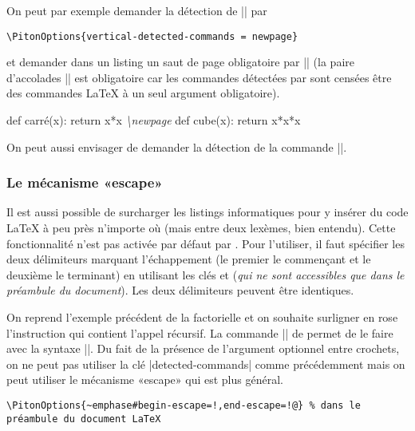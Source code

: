\documentclass[dvipsnames,svgnames]{article}
\begin{document}
\smallskip
On peut par exemple demander la détection de |\newpage| par

\begin{Verbatim}
\PitonOptions{vertical-detected-commands = newpage}
\end{Verbatim}

et demander dans un listing un saut de page obligatoire par |\newpage{}| (la paire
d'accolades |{}| est obligatoire car les commandes détectées par  sont censées
être des commandes LaTeX à un seul argument obligatoire).

\medskip
\begin{Code}
\begin{Piton}
def carré(x):
    return x*x   \emph{\textbackslash{}newpage{}}
def cube(x):
    return x*x*x
\end{Piton}    
\end{Code}

\medskip
On peut aussi envisager de demander la détection de la commande |\vspace|.

\subsubsection{Le mécanisme «escape»}

\label{escape}

Il est aussi possible de surcharger les listings informatiques pour y insérer du code
LaTeX à peu près n'importe où (mais entre deux lexèmes, bien entendu). Cette
fonctionnalité n'est pas activée par défaut par . Pour l'utiliser, il faut
spécifier les deux délimiteurs marquant l'échappement (le premier le commençant et le
deuxième le terminant) en utilisant les clés  et
 (\emph{qui ne sont accessibles que dans le préambule du
  document}). Les deux délimiteurs peuvent être identiques.

\medskip
On reprend l'exemple précédent de la factorielle et on souhaite surligner en rose
l'instruction qui contient l'appel récursif. La commande |\highLight| de 
permet de le faire avec la syntaxe ||. Du fait de la présence de
l'argument optionnel entre crochets, on ne peut pas utiliser la clé |detected-commands|
comme précédemment mais on peut utiliser le mécanisme «escape» qui est plus général.

\smallskip
\begin{small}
\begin{Verbatim}
\PitonOptions{~emphase#begin-escape=!,end-escape=!@} % dans le préambule du document LaTeX
\end{Verbatim}
\end{small}
\end{document}
